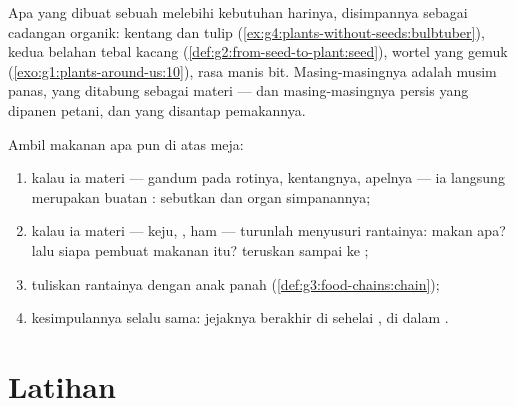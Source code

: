 \begin{example}\label{ex:g6:plants-are-producers:pantry}
Apa yang dibuat sebuah  melebihi kebutuhan harinya, disimpannya
sebagai cadangan organik:  kentang dan  tulip
(\cref{ex:g4:plants-without-seeds:bulbtuber}), kedua belahan tebal
kacang (\cref{def:g2:from-seed-to-plant:seed}),  wortel yang gemuk
(\cref{exo:g1:plants-around-us:10}), rasa manis  bit.
Masing-masingnya adalah  musim panas, yang ditabung sebagai
materi --- dan masing-masingnya persis yang dipanen petani, dan yang
disantap pemakannya.
\end{example}

\begin{method}\label{met:g6:plants-are-producers:trace}
Ambil makanan apa pun di atas meja:
\begin{enumerate}
  \item kalau ia materi  --- gandum pada rotinya, kentangnya,
        apelnya --- ia langsung merupakan buatan : sebutkan
         dan organ simpanannya;
  \item kalau ia materi  --- keju, , ham --- turunlah
        menyusuri rantainya:  makan apa? lalu siapa pembuat
        makanan itu? teruskan sampai ke ;
  \item tuliskan rantainya dengan anak panah
        (\cref{def:g3:food-chains:chain});
  \item kesimpulannya selalu sama: jejaknya berakhir di sehelai ,
        di dalam .
\end{enumerate}
\end{method}

\section{Latihan}


